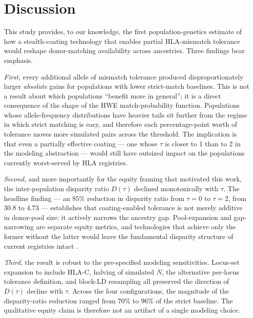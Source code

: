 \documentclass[11pt]{article}
\begin{document}
\section{Discussion}
\label{sec:discussion}

This study provides, to our knowledge, the first population-genetics estimate of how a stealth-coating technology that enables partial HLA-mismatch tolerance would reshape donor-matching availability across ancestries. Three findings bear emphasis.

\emph{First,} every additional allele of mismatch tolerance produced disproportionately larger \emph{absolute} gains for populations with lower strict-match baselines. This is not a result about which populations ``benefit more in general''; it is a direct consequence of the shape of the HWE match-probability function. Populations whose allele-frequency distributions have heavier tails sit further from the regime in which strict matching is easy, and therefore each percentage-point worth of tolerance moves more simulated pairs across the threshold. The implication is that even a partially effective coating --- one whose $\tau$ is closer to 1 than to 2 in the modeling abstraction --- would still have outsized impact on the populations currently worst-served by HLA registries.

\emph{Second,} and more importantly for the equity framing that motivated this work, the inter-population disparity ratio $D(\tau)$ declined monotonically with $\tau$. The headline finding --- an $85\%$ reduction in disparity ratio from $\tau = 0$ to $\tau = 2$, from $30.8$ to $4.73$ --- establishes that coating-enabled tolerance is not merely additive in donor-pool size: it actively narrows the ancestry gap. Pool-expansion and gap-narrowing are separate equity metrics, and technologies that achieve only the former without the latter would leave the fundamental disparity structure of current registries intact \citep{barker2019cord,krieger2014discrimination}.

\emph{Third,} the result is robust to the pre-specified modeling sensitivities. Locus-set expansion to include HLA-C, halving of simulated $N$, the alternative per-locus tolerance definition, and block-LD resampling all preserved the direction of $D(\tau)$ decline with $\tau$. Across the four configurations, the magnitude of the disparity-ratio reduction ranged from $70\%$ to $96\%$ of the strict baseline. The qualitative equity claim is therefore not an artifact of a single modeling choice.
\end{document}
